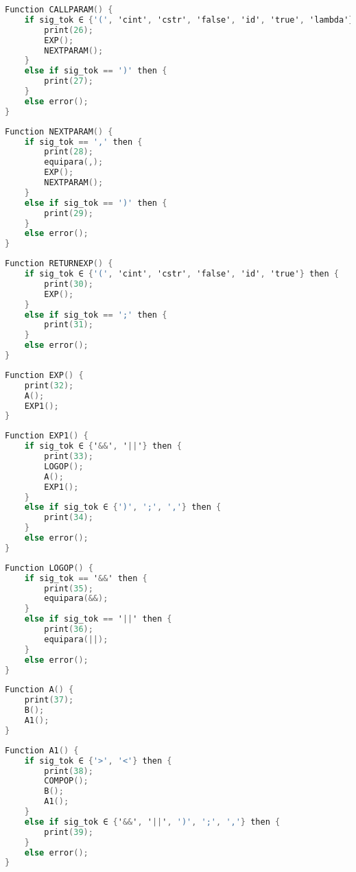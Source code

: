 \begin{lstlisting}[language=C, caption={CALLPARAM}]
Function CALLPARAM() {
    if sig_tok ∈ {'(', 'cint', 'cstr', 'false', 'id', 'true', 'lambda'} then {
        print(26);
        EXP();
        NEXTPARAM();
    }
    else if sig_tok == ')' then {
        print(27);
    }
    else error();
}
\end{lstlisting}

\begin{lstlisting}[language=C, caption={NEXTPARAM}]
Function NEXTPARAM() {
    if sig_tok == ',' then {
        print(28);
        equipara(,);
        EXP();
        NEXTPARAM();
    }
    else if sig_tok == ')' then {
        print(29);
    }
    else error();
}
\end{lstlisting}

\begin{lstlisting}[language=C, caption={RETURNEXP}]
Function RETURNEXP() {
    if sig_tok ∈ {'(', 'cint', 'cstr', 'false', 'id', 'true'} then {
        print(30);
        EXP();
    }
    else if sig_tok == ';' then {
        print(31);
    }
    else error();
}
\end{lstlisting}

\begin{lstlisting}[language=C, caption={EXP}]
Function EXP() {
    print(32);
    A();
    EXP1();
}
\end{lstlisting}
\newpage
\begin{lstlisting}[language=C, caption={EXP1}]
Function EXP1() {
    if sig_tok ∈ {'&&', '||'} then {
        print(33);
        LOGOP();
        A();
        EXP1();
    }
    else if sig_tok ∈ {')', ';', ','} then {
        print(34);
    }
    else error();
}
\end{lstlisting}

\begin{lstlisting}[language=C, caption={LOGOP}]
Function LOGOP() {
    if sig_tok == '&&' then {
        print(35);
        equipara(&&);
    }
    else if sig_tok == '||' then {
        print(36);
        equipara(||);
    }
    else error();
}
\end{lstlisting}

\begin{lstlisting}[language=C, caption={A}]
Function A() {
    print(37);
    B();
    A1();
}
\end{lstlisting}

\begin{lstlisting}[language=C, caption={A1}]
Function A1() {
    if sig_tok ∈ {'>', '<'} then {
        print(38);
        COMPOP();
        B();
        A1();
    }
    else if sig_tok ∈ {'&&', '||', ')', ';', ','} then {
        print(39);
    }
    else error();
}
\end{lstlisting}

